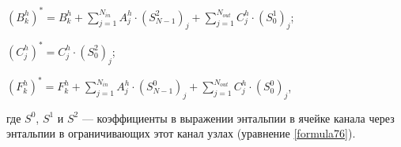 \begin{itemize}[topsep=5pt, itemsep=-3pt]
\noindent \hspace{0.6cm} $(B_k^h)^{*} = B_k^h + \sum_{j=1}^{N_{in}} A_j^h \cdot (S_{N-1}^2)_j + \sum_{j=1}^{N_{out}} C_j^h \cdot (S_0^1)_j$;

\noindent \hspace{0.6cm} $(C_j^h)^{*} = C_j^h \cdot (S_0^2)_j$; 

\noindent \hspace{0.6cm} $(F_k^h)^{*} = F_k^h+\sum_{j=1}^{N_{in}} A_j^h \cdot (S_{N-1}^0)_j + \sum_{j=1}^{N_{out}} C_j^h \cdot (S_0^0)_j$,

\noindent где $S^0$, $S^1$ и $S^2$ --- коэффициенты в выражении энтальпии в ячейке канала через энтальпии в ограничивающих этот канал узлах (уравнение \eqref{formula76}).  

\end{itemize}

